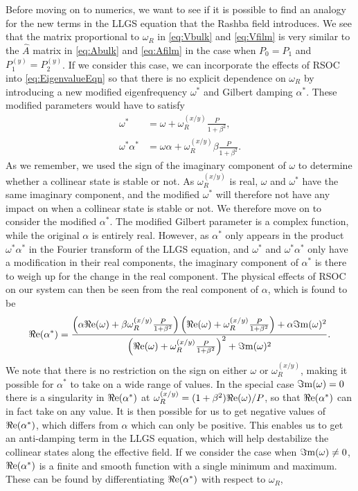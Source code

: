Before moving on to numerics, we want to see if it is possible to find an analogy for the new terms in the LLGS equation that the Rashba field introduces. We see that the matrix proportional to $\omega_R$ in \eqref{eq:Vbulk} and \eqref{eq:Vfilm} is very similar to the $\hat{A}$ matrix in \eqref{eq:Abulk} and \eqref{eq:Afilm} in the case when $P_0=P_1$ and $P_1^{(y)}=P_2^{(y)}$. If we consider this case, we can incorporate the effects of RSOC into \eqref{eq:EigenvalueEqn} so that there is no explicit dependence on $\omega_R$ by introducing a new modified eigenfrequency $\omega^*$ and Gilbert damping $\alpha^*$. These modified parameters would have to satisfy
\begin{subequations}
\begin{align}
    \omega^* &= \omega+\omega_R^{(x/y)}\frac{P}{1+\beta^2}, \\
    \omega^*\alpha^* &= \omega\alpha+\omega_R^{(x/y)}\beta\frac{P}{1+\beta^2}.
\end{align}
\end{subequations}
As we remember, we used the sign of the imaginary component of $\omega$ to determine whether a collinear state is stable or not. As $\omega_R^{(x/y)}$ is real, $\omega$ and $\omega^*$ have the same imaginary component, and the modified $\omega^*$ will therefore not have any impact on when a collinear state is stable or not. We therefore move on to consider the modified $\alpha^*$. The modified Gilbert parameter is a complex function, while the original $\alpha$ is entirely real. However, as $\alpha^*$ only appears in the product $\omega^*\alpha^*$ in the Fourier transform of the LLGS equation, and $\omega^*$ and $\omega^*\alpha^*$ only have a modification in their real components, the imaginary component of $\alpha^*$ is there to weigh up for the change in the real component. The physical effects of RSOC on our system can then be seen from the real component of $\alpha$, which is found to be
\begin{align}
    {\Re\mathrm{e}}(\alpha^*) = \frac{\left(\alpha{\Re\mathrm{e}}(\omega) + \beta\omega^{(x/y)}_R \frac{P}{1+\beta^2}\right)\left({\Re\mathrm{e}}(\omega) + \omega^{(x/y)}_R \frac{P}{1+\beta^2}\right) + \alpha{\Im\mathrm{m}}(\omega)^2}{\left({\Re\mathrm{e}}(\omega) + \omega^{(x/y)}_R \frac{P}{1+\beta^2}\right)^2+{\Im\mathrm{m}}(\omega)^2}.
\end{align}
We note that there is no restriction on the sign on either $\omega$ or $\omega_R^{(x/y)}$, making it possible for $\alpha^*$ to take on a wide range of values. In the special case ${\Im\mathrm{m}}(\omega)=0$ there is a singularity in ${\Re\mathrm{e}}(\alpha^*)$ at $\omega_R^{(x/y)}=(1+\beta^2){\Re\mathrm{e}}(\omega)/P$, so that ${\Re\mathrm{e}}(\alpha^*)$ can in fact take on any value. It is then possible for us to get negative values of ${\Re\mathrm{e}}(\alpha^*)$, which differs from $\alpha$ which can only be positive. This enables us to get an anti-damping term in the LLGS equation, which will help destabilize the collinear states along the effective field. If we consider the case when ${\Im\mathrm{m}}(\omega)\neq0$, ${\Re\mathrm{e}}(\alpha^*)$ is a finite and smooth function with a single minimum and maximum. These can be found by differentiating ${\Re\mathrm{e}}(\alpha^*)$ with respect to $\omega_R$, 
